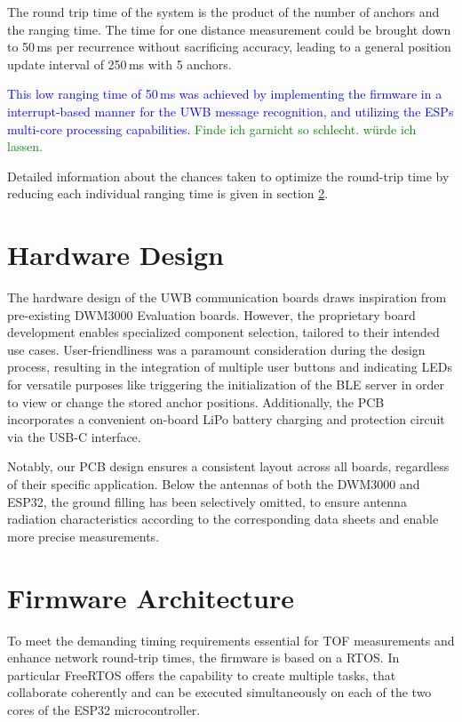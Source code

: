 \documentclass[conference, a4paper]{IEEEtran}
\begin{document}
The round trip time of the system is the product of the number of anchors and the ranging time.
The time for one distance measurement could be brought down to 50\,ms per recurrence without sacrificing accuracy, leading to a general position update interval of 250\,ms with 5 anchors. 

\textcolor{blue}{
This low ranging time of 50\,ms was achieved by implementing the firmware in a interrupt-based manner for the \ac{UWB} message recognition, and utilizing the ESPs multi-core processing capabilities.
}
\textcolor{green}{Finde ich garnicht so schlecht. würde ich lassen.}

Detailed information about the chances taken to optimize the round-trip time by reducing each individual ranging time
is given in section \ref{section:firmware}.


\section{Hardware Design}\label{section:hardware}
The hardware design of the \ac{UWB} communication boards draws inspiration from pre-existing DWM3000 Evaluation
boards.
However, the proprietary board development enables specialized component selection, tailored to their intended use cases.
User-friendliness was a paramount consideration during the design process,
resulting in the integration of multiple user buttons and indicating LEDs for versatile purposes like triggering the initialization of the \ac{BLE} server in order to view or change the stored anchor positions. 
Additionally, the PCB incorporates a convenient on-board LiPo battery charging and protection circuit via the USB-C interface.

Notably, our PCB design ensures a consistent layout across all boards, regardless of their specific application.
Below the antennas of both the DWM3000 and ESP32, the ground filling has been selectively omitted, to ensure antenna radiation characteristics according to the corresponding data sheets and enable more precise measurements.

\section{Firmware Architecture}\label{section:firmware}
To meet the demanding timing requirements essential for \ac{TOF} measurements and enhance network round-trip times,
the firmware is based on a \ac{RTOS}.
In particular FreeRTOS \cite{FreeRTOS_2023} offers the capability to create multiple tasks, that collaborate coherently and can be executed simultaneously on each of the two cores of the ESP32 microcontroller.
\end{document}
